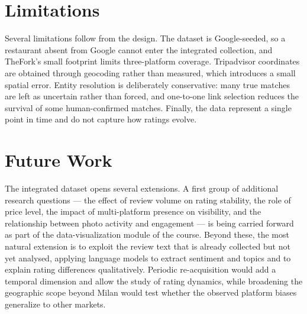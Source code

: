 \section{Limitations}

Several limitations follow from the design. The dataset is Google-seeded, so a
restaurant absent from Google cannot enter the integrated collection, and TheFork's
small footprint limits three-platform coverage. Tripadvisor coordinates are obtained
through geocoding rather than measured, which introduces a small spatial error.
Entity resolution is deliberately conservative: many true matches are left as
uncertain rather than forced, and one-to-one link selection reduces the survival of
some human-confirmed matches. Finally, the data represent a single point in time and
do not capture how ratings evolve.

\section{Future Work}

The integrated dataset opens several extensions. A first group of additional research
questions --- the effect of review volume on rating stability, the role of price level,
the impact of multi-platform presence on visibility, and the relationship between photo
activity and engagement --- is being carried forward as part of the data-visualization
module of the course. Beyond these, the most natural extension is to exploit the
review text that is already collected but not yet analysed, applying language models
to extract sentiment and topics and to explain rating differences qualitatively.
Periodic re-acquisition would add a temporal dimension and allow the study of rating
dynamics, while broadening the geographic scope beyond Milan would test whether the
observed platform biases generalize to other markets.

